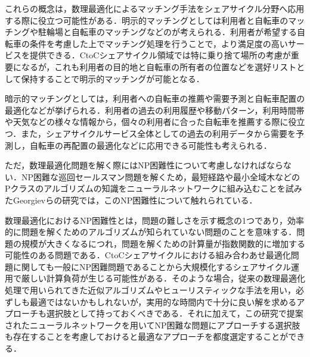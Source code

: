           \par これらの概念は，数理最適化によるマッチング手法をシェアサイクル分野へ応用する際に役立つ可能性がある．明示的マッチングとしては利用者と自転車のマッチングや駐輪場と自転車のマッチングなどのが考えられる．利用者が希望する自転車の条件を考慮した上でマッチング処理を行うことで，より満足度の高いサービスを提供できる．CtoCシェアサイクル領域では特に乗り捨て場所の考慮が重要になるが，これも利用者の目的地と自転車の所有者の位置などを選好リストとして保持することで明示的マッチングが可能となる．
          \par 暗示的マッチングとしては，利用者への自転車の推薦や需要予測と自転車配置の最適化などが挙げられる．利用者の過去の利用履歴や移動パターン，利用時間帯や天気などの様々な情報から，個々の利用者に合った自転車を推薦する際に役立つ．また，シェアサイクルサービス全体としての過去の利用データから需要を予測し，自転車の再配置の最適化などに応用できる可能性も考えられる．
          \par ただ，数理最適化問題を解く際にはNP困難性について考慮しなければならない．NP困難な巡回セールスマン問題を解くため，最短経路や最小全域木などのPクラスのアルゴリズムの知識をニューラルネットワークに組み込むことを試みたGeorgievらの研究では，このNP困難性について触れられている．
          \par 数理最適化におけるNP困難性とは，問題の難しさを示す概念の1つであり，効率的に問題を解くためのアルゴリズムが知られていない問題のことを意味する．問題の規模が大きくなるにつれ，問題を解くための計算量が指数関数的に増加する可能性のある問題である．CtoCシェアサイクルにおける組み合わあせ最適化問題に関しても一般にNP困難問題であることから大規模化するシェアサイクル運用で厳しい計算負荷が生じる可能性がある．そのような場合，従来の数理最適化処理で用いられてきた近似アルゴリズムやヒューリスティックな手法を用い，必ずしも最適ではないかもしれないが，実用的な時間内で十分に良い解を求めるアプローチも選択肢として持っておくべきである．それに加えて，この研究で提案されたニューラルネットワークを用いてNP困難な問題にアプローチする選択肢も存在することを考慮しておけると最適なアプローチを都度選定することができる．
          
